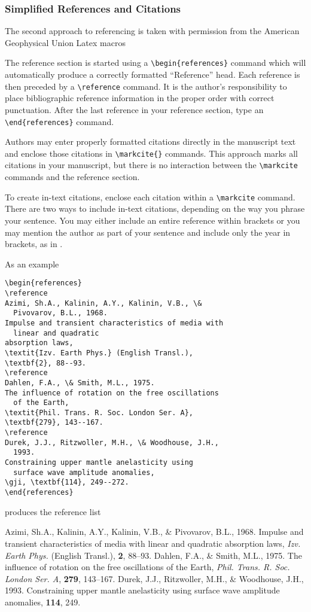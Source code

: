 \subsubsection{Simplified References and Citations}

The second approach to referencing is taken with permission from the American
Geophysical Union Latex macros

The reference section is started using a \verb"\begin{references}" command which
will automatically produce a correctly formatted ``Reference'' head. Each
reference is then preceded by a \verb"\reference" command. It is the author's
responsibility to place bibliographic reference information in the proper order
with correct punctuation. After the last reference in your reference section,
type an \verb"\end{references}" command.

Authors may enter properly formatted citations directly in the manuscript text
and enclose those citations in \verb"\markcite{}" commands. This approach marks
all citations in your manuscript, but there is no interaction between the
\verb"\markcite" commands and the reference section.

To create in-text citations, enclose each citation within a \verb"\markcite"
command. There are two ways to include in-text citations, depending on the way
you phrase your sentence. You may either include an entire reference within
brackets  or you may mention the author as part
of your sentence and include only the year in brackets, as in .

As an example
\begin{verbatim}
\begin{references}
\reference
Azimi, Sh.A., Kalinin, A.Y., Kalinin, V.B., \&
  Pivovarov, B.L., 1968.
Impulse and transient characteristics of media with
  linear and quadratic
absorption laws,
\textit{Izv. Earth Phys.} (English Transl.),
\textbf{2}, 88--93.
\reference
Dahlen, F.A., \& Smith, M.L., 1975.
The influence of rotation on the free oscillations
  of the Earth,
\textit{Phil. Trans. R. Soc. London Ser. A},
\textbf{279}, 143--167.
\reference
Durek, J.J., Ritzwoller, M.H., \& Woodhouse, J.H.,
  1993.
Constraining upper mantle anelasticity using
  surface wave amplitude anomalies,
\gji, \textbf{114}, 249--272.
\end{references}
\end{verbatim}
produces the reference list
\begin{references}
Azimi, Sh.A., Kalinin, A.Y., Kalinin, V.B., \& Pivovarov, B.L., 1968.
Impulse and transient characteristics of media with linear and  quadratic
absorption laws,
\textit{Izv. Earth Phys.} (English Transl.),
\textbf{2}, 88--93.
Dahlen, F.A., \& Smith, M.L., 1975.
The influence of rotation on the free oscillations of the Earth,
\textit{Phil. Trans. R. Soc. London Ser. A}, \textbf{279}, 143--167.
Durek, J.J., Ritzwoller, M.H., \& Woodhouse, J.H., 1993. Constraining upper
mantle anelasticity using surface wave amplitude anomalies, \gji{} \textbf{114},
249.
\end{references}

